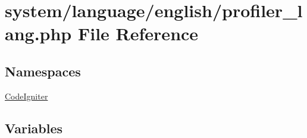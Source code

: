 \hypertarget{profiler__lang_8php}{}\section{system/language/english/profiler\+\_\+lang.php File Reference}
\label{profiler__lang_8php}
\subsection*{Namespaces}
\begin{DoxyCompactItemize}
\item 
 \mbox{\hyperlink{namespace_code_igniter}{Code\+Igniter}}
\end{DoxyCompactItemize}
\subsection*{Variables}
